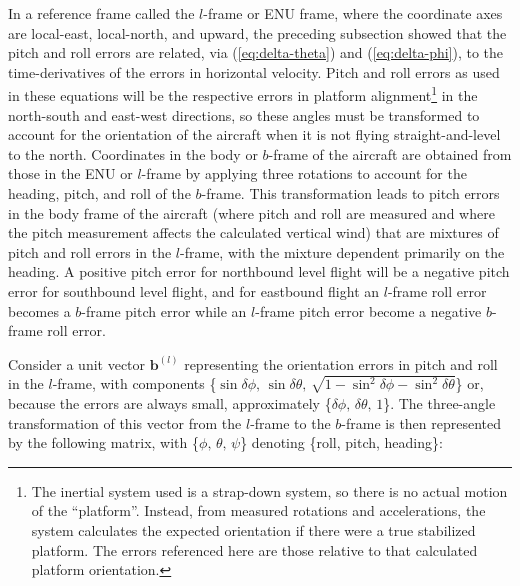 \documentclass[12pt,twoside,english]{article}\usepackage[]{graphicx}\usepackage[]{color}
\let\OrgIndex\index
\renewcommand*{\index}[1]{\OrgIndex{#1}}
\begin{document}
In a reference frame called the $l$-frame or ENU frame, where the coordinate axes are local-east, local-north, and upward, the preceding subsection showed that the pitch and roll errors are related, via (\ref{eq:delta-theta}) and (\ref{eq:delta-phi}), to the time-derivatives of the errors in horizontal velocity. Pitch and roll errors as used in these equations will be the respective errors in platform alignment\footnote{The inertial system used is a strap-down system, so there is no actual motion of the ``platform''. Instead, from measured rotations and accelerations, the system calculates the expected orientation if there were a true stabilized platform. The errors referenced here are those relative to that calculated platform orientation.} in the north-south and east-west directions, so these angles must be transformed to account for the orientation of the aircraft when it is not flying straight-and-level to the north. Coordinates in the body or $b$-frame of the aircraft are obtained from those in the ENU or $l$-frame by applying three rotations to account for the heading, pitch, and roll of the $b$-frame. This transformation leads to pitch errors in the body frame of the aircraft (where pitch and roll are measured and where the pitch measurement affects the calculated vertical wind) that are mixtures of pitch and roll errors in the $l$-frame, with the mixture dependent primarily on the heading. A positive pitch error for northbound level flight will be a negative pitch error for southbound level flight, and for eastbound flight an $l$-frame roll error becomes a $b$-frame pitch error while an $l$-frame pitch error become a negative $b$-frame roll error. 

Consider a unit vector $\mathbf{b}^{(l)}$ representing the orientation errors in pitch and roll in the $l$-frame, with components \{$\sin\delta\phi,\,\sin\delta\theta,\,\sqrt{1-\sin^{2}\delta\phi-\sin^{2}\delta\theta}$\} or, because the errors are always small, approximately \{$\delta\phi,\,\delta\theta,\,1$\}. The three-angle transformation of this vector from the $l$-frame to the $b$-frame is then represented by the following matrix, with 
\{$\phi,\,\theta,\,\psi$\} denoting \{roll, pitch, heading\}:
\end{document}
